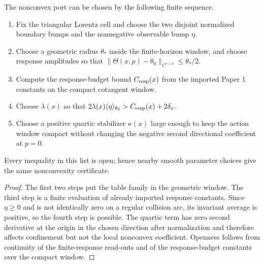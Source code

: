 \begin{corollary}
\label{cor:supp_concrete_parameter_recipe}
The nonconvex port can be chosen by the following finite sequence.
\begin{enumerate}[label=\textup{(\roman*)},wide,labelindent=0pt]
  \item Fix the triangular Lorentz cell and choose the two disjoint normalized
  boundary bumps and the nonnegative observable bump \(\eta\).
  \item Choose a geometric radius \(\theta_*\) inside the finite-horizon
  window, and choose response amplitudes so that
  \(\|\Theta(x,p)-\theta_0\|_{C^{r+3}}\le\theta_*/2\).
  \item Compute the response-budget bound \(C_{\rm resp}(x)\) from the imported
  Paper 1 constants on the compact cotangent window.
  \item Choose \(\lambda(x)\) so that
  \(2\lambda(x)\langle\eta\rangle_{\theta_0}>C_{\rm resp}(x)+2\delta_x\).
  \item Choose a positive quartic stabilizer \(\kappa(x)\) large enough to keep
  the action window compact without changing the negative second directional
  coefficient at \(p=0\).
\end{enumerate}
Every inequality in this list is open; hence nearby smooth parameter choices
give the same nonconvexity certificate.
\end{corollary}

\begin{proof}
The first two steps put the table family in the geometric window.  The third
step is a finite evaluation of already imported response constants.  Since
\(\eta\ge0\) and is not identically zero on a regular collision arc, its
invariant average is positive, so the fourth step is possible.  The quartic
term has zero second derivative at the origin in the chosen direction after
normalization and therefore affects confinement but not the local nonconvex
coefficient.  Openness follows from continuity of the finite-response read-outs
and of the response-budget constants over the compact window.
\end{proof}

